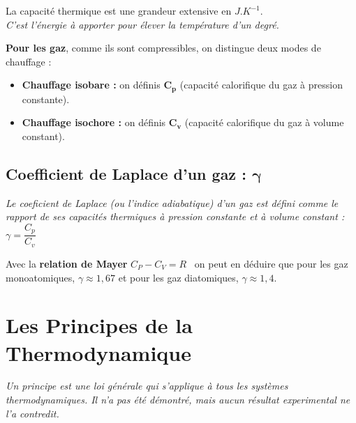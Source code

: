 \documentclass[a4paper,12pt]{article}
\begin{document}
    La capacité thermique est une grandeur extensive en $J.K^{-1}$.\\
    \textit{C'est l'énergie à apporter pour élever la température d'un degré.}
    \vspace{3mm}

    \textbf{Pour les gaz}, comme ils sont compressibles, on distingue deux modes de chauffage :
    \vspace{3pt}
    \begin{itemize}[label=\textbullet]
        \item \textbf{Chauffage isobare :} on définis $\bm{C_p}$ (capacité calorifique du gaz à pression constante).
        \item \textbf{Chauffage isochore :} on définis $\bm{C_v}$ (capacité calorifique du gaz à volume constant).
    \end{itemize}

    \subsection*{Coefficient de Laplace d'un gaz : $\bm{\gamma}$}

    \textit{Le coeficient de Laplace (ou l'indice adiabatique) d'un gaz est défini comme le rapport de
    ses capacités thermiques à pression constante et à volume constant :} $\boxed{\gamma = \dfrac{C_p}{C_v}}$

    Avec la \textbf{relation de Mayer} $C_P - C_V = R$ \ on peut en déduire que pour les gaz monoatomiques, $\gamma \approx 1,67$ et pour les gaz diatomiques, $\gamma \approx 1,4$.




\section{Les Principes de la Thermodynamique}

    \textit{Un principe est une loi générale qui s'applique à tous les systèmes thermodynamiques. Il n'a pas été démontré, mais aucun résultat experimental ne l'a contredit.}
\end{document}

